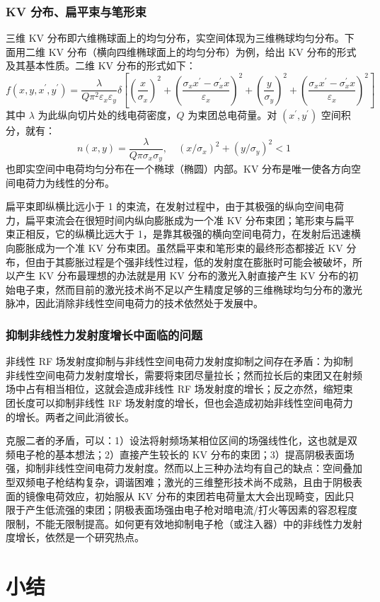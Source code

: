 \subsubsection{KV 分布、扁平束与笔形束}
三维 KV 分布即六维椭球面上的均匀分布，实空间体现为三维椭球均匀分布。下面用二维 KV 分布（横向四维椭球面上的均匀分布）为例，给出 KV 分布的形式及其基本性质。二维 KV 分布的形式如下：
\begin{equation}
f(x, y, x^{\prime}, y^{\prime}) = \frac{\lambda}{Q\pi^2\varepsilon_x\varepsilon_y}\delta\left[\left(\frac{x}{\sigma_x}\right)^2+\left(\frac{\sigma_x x^{\prime}-\sigma_x^{\prime} x}{\varepsilon_x}\right)^2+\left(\frac{y}{\sigma_y}\right)^2+\left(\frac{\sigma_x x^{\prime}-\sigma_x^{\prime} x}{\varepsilon_x}\right)^2\right]
\end{equation}
其中 $\lambda$ 为此纵向切片处的线电荷密度，$Q$ 为束团总电荷量。对 $(x^{\prime}, y^{\prime})$ 空间积分，就有：
\begin{equation}
n(x, y) = \frac{\lambda}{Q\pi\sigma_x\sigma_y},\quad (x/\sigma_x)^2+(y/\sigma_y)^2 < 1
\end{equation}
也即实空间中电荷均匀分布在一个椭球（椭圆）内部。KV 分布是唯一使各方向空间电荷力为线性的分布\cite{Kapchinskij:1959aa}。

扁平束即纵横比远小于 1 的束流，在发射过程中，由于其极强的纵向空间电荷力，扁平束流会在很短时间内纵向膨胀成为一个准 KV 分布束团；笔形束与扁平束正相反，它的纵横比远大于 1，是靠其极强的横向空间电荷力，在发射后迅速横向膨胀成为一个准 KV 分布束团。虽然扁平束和笔形束的最终形态都接近 KV 分布，但由于其膨胀过程是个强非线性过程，低的发射度在膨胀时可能会被破坏，所以产生 KV 分布最理想的办法就是用 KV 分布的激光入射直接产生 KV 分布的初始电子束，然而目前的激光技术尚不足以产生精度足够的三维椭球均匀分布的激光脉冲，因此消除非线性空间电荷力的技术依然处于发展中。

\subsubsection{抑制非线性力发射度增长中面临的问题}
非线性 RF 场发射度抑制与非线性空间电荷力发射度抑制之间存在矛盾：为抑制非线性空间电荷力发射度增长，需要将束团尽量拉长；然而拉长后的束团又在射频场中占有相当相位，这就会造成非线性 RF 场发射度的增长；反之亦然，缩短束团长度可以抑制非线性 RF 场发射度的增长，但也会造成初始非线性空间电荷力的增长。两者之间此消彼长。

克服二者的矛盾，可以：1）设法将射频场某相位区间的场强线性化，这也就是双频电子枪的基本想法；2）直接产生较长的 KV 分布的束团；3）提高阴极表面场强，抑制非线性空间电荷力发射度。然而以上三种办法均有自己的缺点：空间叠加型双频电子枪结构复杂，调谐困难；激光的三维整形技术尚不成熟，且由于阴极表面的镜像电荷效应，初始服从 KV 分布的束团若电荷量太大会出现畸变，因此只限于产生低流强的束团；阴极表面场强由电子枪对暗电流/打火等因素的容忍程度限制，不能无限制提高。如何更有效地抑制电子枪（或注入器）中的非线性力发射度增长，依然是一个研究热点。

\section{小结}

